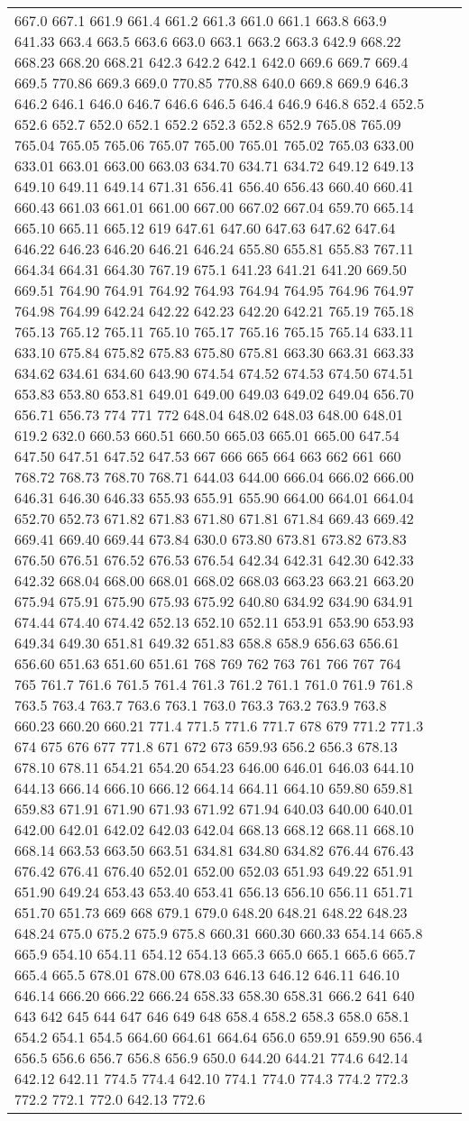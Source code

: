 \begin{longtable}{|L{.1in}|L{.6in}||L{5.65in}|}
667.0 667.1 661.9 661.4 661.2 661.3 661.0 661.1 663.8 663.9 641.33 663.4 663.5 663.6 663.0 663.1 663.2 663.3 642.9 668.22 668.23 668.20 668.21 642.3 642.2 642.1 642.0 669.6 669.7 669.4 669.5 770.86 669.3 669.0 770.85 770.88 640.0 669.8 669.9 646.3 646.2 646.1 646.0 646.7 646.6 646.5 646.4 646.9 646.8 652.4 652.5 652.6 652.7 652.0 652.1 652.2 652.3 652.8 652.9 765.08 765.09 765.04 765.05 765.06 765.07 765.00 765.01 765.02 765.03 633.00 633.01 663.01 663.00 663.03 634.70 634.71 634.72 649.12 649.13 649.10 649.11 649.14 671.31 656.41 656.40 656.43 660.40 660.41 660.43 661.03 661.01 661.00 667.00 667.02 667.04 659.70 665.14 665.10 665.11 665.12 619 647.61 647.60 647.63 647.62 647.64 646.22 646.23 646.20 646.21 646.24 655.80 655.81 655.83 767.11 664.34 664.31 664.30 767.19 675.1 641.23 641.21 641.20 669.50 669.51 764.90 764.91 764.92 764.93 764.94 764.95 764.96 764.97 764.98 764.99 642.24 642.22 642.23 642.20 642.21 765.19 765.18 765.13 765.12 765.11 765.10 765.17 765.16 765.15 765.14 633.11 633.10 675.84 675.82 675.83 675.80 675.81 663.30 663.31 663.33 634.62 634.61 634.60 643.90 674.54 674.52 674.53 674.50 674.51 653.83 653.80 653.81 649.01 649.00 649.03 649.02 649.04 656.70 656.71 656.73 774 771 772 648.04 648.02 648.03 648.00 648.01 619.2 632.0 660.53 660.51 660.50 665.03 665.01 665.00 647.54 647.50 647.51 647.52 647.53 667 666 665 664 663 662 661 660 768.72 768.73 768.70 768.71 644.03 644.00 666.04 666.02 666.00 646.31 646.30 646.33 655.93 655.91 655.90 664.00 664.01 664.04 652.70 652.73 671.82 671.83 671.80 671.81 671.84 669.43 669.42 669.41 669.40 669.44 673.84 630.0 673.80 673.81 673.82 673.83 676.50 676.51 676.52 676.53 676.54 642.34 642.31 642.30 642.33 642.32 668.04 668.00 668.01 668.02 668.03 663.23 663.21 663.20 675.94 675.91 675.90 675.93 675.92 640.80 634.92 634.90 634.91 674.44 674.40 674.42 652.13 652.10 652.11 653.91 653.90 653.93 649.34 649.30 651.81 649.32 651.83 658.8 658.9 656.63 656.61 656.60 651.63 651.60 651.61 768 769 762 763 761 766 767 764 765 761.7 761.6 761.5 761.4 761.3 761.2 761.1 761.0 761.9 761.8 763.5 763.4 763.7 763.6 763.1 763.0 763.3 763.2 763.9 763.8 660.23 660.20 660.21 771.4 771.5 771.6 771.7 678 679 771.2 771.3 674 675 676 677 771.8 671 672 673 659.93 656.2 656.3 678.13 678.10 678.11 654.21 654.20 654.23 646.00 646.01 646.03 644.10 644.13 666.14 666.10 666.12 664.14 664.11 664.10 659.80 659.81 659.83 671.91 671.90 671.93 671.92 671.94 640.03 640.00 640.01 642.00 642.01 642.02 642.03 642.04 668.13 668.12 668.11 668.10 668.14 663.53 663.50 663.51 634.81 634.80 634.82 676.44 676.43 676.42 676.41 676.40 652.01 652.00 652.03 651.93 649.22 651.91 651.90 649.24 653.43 653.40 653.41 656.13 656.10 656.11 651.71 651.70 651.73 669 668 679.1 679.0 648.20 648.21 648.22 648.23 648.24 675.0 675.2 675.9 675.8 660.31 660.30 660.33 654.14 665.8 665.9 654.10 654.11 654.12 654.13 665.3 665.0 665.1 665.6 665.7 665.4 665.5 678.01 678.00 678.03 646.13 646.12 646.11 646.10 646.14 666.20 666.22 666.24 658.33 658.30 658.31 666.2 641 640 643 642 645 644 647 646 649 648 658.4 658.2 658.3 658.0 658.1 654.2 654.1 654.5 664.60 664.61 664.64 656.0 659.91 659.90 656.4 656.5 656.6 656.7 656.8 656.9 650.0 644.20 644.21 774.6 642.14 642.12 642.11 774.5 774.4 642.10 774.1 774.0 774.3 774.2 772.3 772.2 772.1 772.0 642.13 772.6 
\end{longtable}
